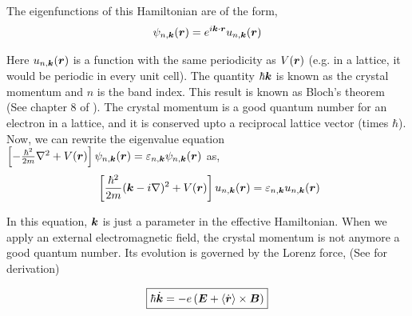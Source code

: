 \documentclass{report}
\renewcommand\vec[1]{\ensuremath\boldsymbol{#1}} %
\begin{document}
The eigenfunctions of this Hamiltonian are of the form,
$$\psi_{n, \vec{k}} (\vec{r}) = e^{i \vec{k}\cdot \vec{r}} u_{n,\vec{k}} (\vec{r})$$

Here $u_{n,\vec{k}} (\vec{r})$ is a function with the same periodicity as $V(\vec{r})$ (e.g. in a lattice, it would be periodic in every unit cell). The quantity $\hbar \vec{k}$ is known as the crystal momentum and $n$ is the band index. This result is known as Bloch's theorem (See chapter 8 of \cite{book:AshcroftMermin76}). The crystal momentum is a good quantum number for an electron in a lattice, and it is conserved upto a reciprocal lattice vector (times $\hbar$).
Now, we can rewrite the eigenvalue equation $\left[-\frac{\hbar^2}{2m}\nabla^2 + V(\vec{r}) \right] \psi_{n, \vec{k}}(\vec{r}) = \varepsilon_{n,\vec{k}} \psi_{n, \vec{k}}(\vec{r})$ as,
\begin{equation}~\label{Eq:effectiveBlochEquation}
	\left[\frac{\hbar^2}{2m}(\vec{k} - i \nabla)^2 + V(\vec{r}) \right]u_{n,\vec{k}} (\vec{r}) = \varepsilon_{n,\vec{k}} u_{n,\vec{k}} (\vec{r})
\end{equation}

In this equation, $\vec{k}$ is just a parameter in the effective Hamiltonian. When we apply an external electromagnetic field, the crystal momentum is not anymore a good quantum number. Its evolution is governed by the Lorenz force, (See \cite{ralph2020berry} for derivation)

\begin{equation} \label{Eq:evolution-of-k}
	\boxed{\hbar \dot{\vec{k}} = -e\left(\vec{E} + \langle\dot{\vec{r}}\rangle \times \vec{B} \right)}
\end{equation}
\end{document}
